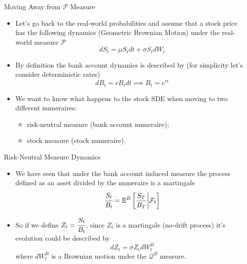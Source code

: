 \documentclass{beamer}
\begin{document}
\begin{frame}{Moving Away from $\mathcal{P}$ Measure}
  \begin{itemize}
  \item<1-> Let's go back to the real-world probabilities and assume that a stock price has the following dynamics (Geometric Brownian Motion) under the real-world measure $\mathcal{P}$
    \begin{equation*}
      dS_t = \mu S_t dt + \sigma S_t dW_t
    \end{equation*}
  \item<2-> By definition the bank account dynamics is described by (for simplicity let's consider deterministic rates)
    \begin{equation*}
      dB_t = rB_tdt\implies B_t = e^{rt}
    \end{equation*}
  \item<3-> We want to know what happens to the stock SDE when moving to two different numeraires:
    \begin{itemize}
    \item<4-> risk-neutral measure (bank account numeraire);
    \item<5-> stock measure (stock numeraire).
    \end{itemize}
  \end{itemize}
\end{frame}

\begin{frame}{Risk-Neutral Measure Dynamics}
  \begin{itemize}
  \item<1-> We have seen that under the bank account induced measure the process defined as an asset divided by the numeraire is a martingale
    \begin{equation*}
      \cfrac{S_t}{B_t} = \mathbb{E}^B\left[\frac{S_T}{B_T}\bigg|\mathcal{F}_t\right]
    \end{equation*}
  \item<2-> So if we define $Z_t=\cfrac{S_t}{B_t}$, since $Z_t$ is a martingale (no-drift process) it's evolution could be described by
    \begin{equation}
      dZ_t = \sigma Z_t dW_t^B
      \label{eq:z_martingale1}
    \end{equation}
    where $dW_t^B$ is a Brownian motion under the $\mathcal{Q}^B$ measure.
  \end{itemize}
\end{frame}
\end{document}
